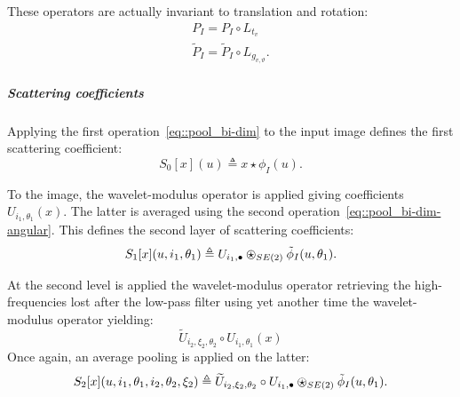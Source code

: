                     These operators are actually invariant to translation and rotation:
                    \begin{align}
                        \label{eq::invariance_pooling}
                        P_I = P_I \circ L_{t_v}\\
                        \tilde{P}_I = \tilde{P}_I \circ L_{g_{v, \vartheta}}.
                    \end{align}

                \subparagraph{Scattering coefficients}
                    Applying the first operation~\ref{eq::pool_bi-dim} to the input image defines the first scattering coefficient:
                    \begin{equation}
                        \label{eq::scatter_input}
                        S_0[x](u) \triangleq x \star \phi_I (u).
                    \end{equation}
                    
                    To the image, the wavelet-modulus operator is applied giving coefficients $U_{i_1, \theta_1}(x)$.
                    The latter is averaged using the second operation~\ref{eq::pool_bi-dim-angular}.
                    This defines the second layer of scattering coefficients:
                    \begin{equation}
                        \label{eq::scatter_first}
                        S_1[x](u, i_1, \theta_1) \triangleq U_{i_1, \bullet} \ostar_{SE(2)} \tilde{\phi}_I(u, \theta_1).
                    \end{equation}

                    At the second level is applied the wavelet-modulus operator retrieving the high-frequencies lost after the low-pass filter using yet another time the wavelet-modulus operator yielding:
                    \begin{equation}
                        \label{eq::cascade_second}
                        \widetilde{U}_{i_2,\xi_2, \theta_2} \circ U_{i_1, \theta_1}(x)
                    \end{equation}
                    Once again, an average pooling is applied on the latter:
                    \begin{equation}
                        \label{eq::scatter_second}
                        S_2[x](u, i_1, \theta_1, i_2, \theta_2, \xi_2) \triangleq \widetilde{U}_{i_2,\xi_2, \theta_2} \circ U_{i_1, \bullet} \ostar_{SE(2)} \tilde{\phi}_I(u, \theta_1).
                    \end{equation}
                    
